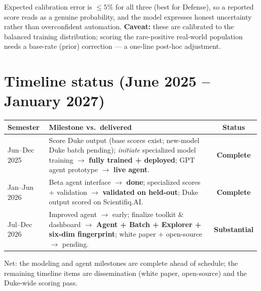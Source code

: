 \documentclass[11pt]{article}
\newcommand{\stDone}{\textbf{\textcolor{good}{Complete}}}
\newcommand{\stSub}{\textbf{\textcolor{amber}{Substantial}}}
\begin{document}
\noindent Expected calibration error is $\leq 5\%$ for all three (best for Defense),
so a reported score reads as a genuine probability, and the model expresses honest
uncertainty rather than overconfident automation. \textbf{Caveat:} these are
calibrated to the balanced training distribution; scoring the rare-positive
real-world population needs a base-rate (prior) correction --- a one-line post-hoc
adjustment.

\section{Timeline status (June 2025 -- January 2027)}
\begin{center}
\begin{tabular}{@{}p{3.4cm}p{8.5cm}c@{}}
\toprule
\textbf{Semester} & \textbf{Milestone vs.\ delivered} & \textbf{Status} \\
\midrule
Jun--Dec 2025 & Score Duke output (base scores exist; new-model Duke batch pending); \emph{initiate} specialized model training $\rightarrow$ \textbf{fully trained + deployed}; GPT agent prototype $\rightarrow$ \textbf{live agent}. & \stDone \\
Jan--Jun 2026 & Beta agent interface $\rightarrow$ \textbf{done}; specialized scores + validation $\rightarrow$ \textbf{validated on held-out}; Duke output scored on Scientifiq.AI. & \stDone \\
Jul--Dec 2026 & Improved agent $\rightarrow$ early; finalize toolkit \& dashboard $\rightarrow$ \textbf{Agent + Batch + Explorer + six-dim fingerprint}; white paper + open-source $\rightarrow$ pending. & \stSub \\
\bottomrule
\end{tabular}
\end{center}
Net: the modeling and agent milestones are complete ahead of schedule; the
remaining timeline items are dissemination (white paper, open-source) and the
Duke-wide scoring pass.
\end{document}
